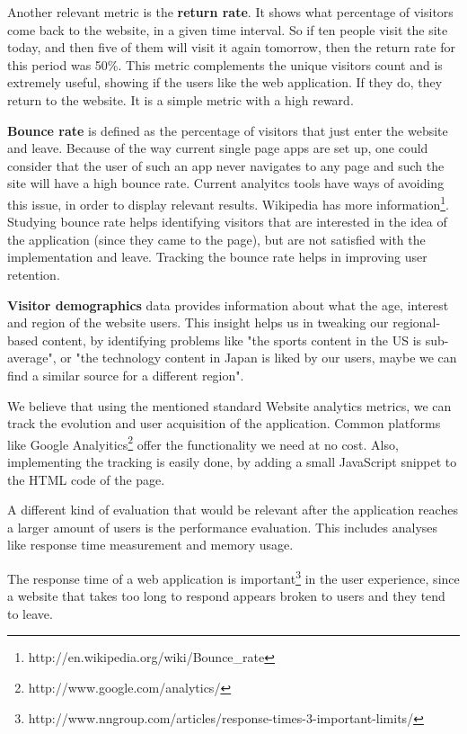 \documentclass{acm_proc_10ptArticle-sp}
\begin{document}
Another relevant metric is the \textbf{return rate}. It shows what percentage of visitors come back to the website, in a given time interval. So if ten people visit the site today, and then five of them will visit it again tomorrow, then the return rate for this period was 50\%. This metric complements the unique visitors count and is extremely useful, showing if the users like the web application. If they do, they return to the website. It is a simple metric with a high reward.

\textbf{Bounce rate} is defined as the percentage of visitors that just enter the website and leave. Because of the way current single page apps are set up, one could consider that the user of such an app never navigates to any page and such the site will have a high bounce rate. Current analyitcs tools have ways of avoiding this issue, in order to display relevant results. Wikipedia has more information\footnote{http://en.wikipedia.org/wiki/Bounce\_rate}. Studying bounce rate helps identifying visitors that are interested in the idea of the application (since they came to the page), but are not satisfied with the implementation and leave. Tracking the bounce rate helps in improving user retention.

\textbf{Visitor demographics} data provides information about what the age, interest and region of the website users. This insight helps us in tweaking our regional-based content, by identifying problems like "the sports content in the US is sub-average", or "the technology content in Japan is liked by our users, maybe we can find a similar source for a different region".

We believe that using the mentioned standard Website analytics metrics, we can track the evolution and user acquisition of the application. Common platforms like Google Analyitics\footnote{http://www.google.com/analytics/} offer the functionality we need at no cost. Also, implementing the tracking is easily done, by adding a small JavaScript snippet to the HTML code of the page.

A different kind of evaluation that would be relevant after the application reaches a larger amount of users is the performance evaluation. This includes analyses like response time measurement and memory usage.

The response time of a web application is important\footnote{http://www.nngroup.com/articles/response-times-3-important-limits/} in the user experience, since a website that takes too long to respond appears broken to users and they tend to leave.
\end{document}
